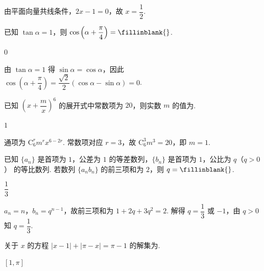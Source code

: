 \begin{solution}
由平面向量共线条件，\(2x-1=0\)，故 \(x=\dfrac12\).
\end{solution}

\begin{problem}
已知 \(\tan\alpha=1\)，则 \(\cos\left(\alpha+\dfrac{\pi}{4}\right)=\fillinblank{}\).
\end{problem}

\begin{answer}
\(0\)
\end{answer}

\begin{solution}
由 \(\tan\alpha=1\) 得 \(\sin\alpha=\cos\alpha\)，因此
\(\cos\left(\alpha+\dfrac{\pi}{4}\right)=\dfrac{\sqrt2}{2}(\cos\alpha-\sin\alpha)=0\).
\end{solution}

\begin{problem}
已知 \(\left(x+\dfrac{m}{x}\right)^6\) 的展开式中常数项为 \(20\)，则实数 \(m\) 的值为\fillinblank{}.
\end{problem}

\begin{answer}
\(1\)
\end{answer}

\begin{solution}
通项为 \(\mathrm C_6^r m^r x^{6-2r}\). 常数项对应 \(r=3\)，故 \(\mathrm C_6^3m^3=20\)，即 \(m=1\).
\end{solution}

\begin{problem}
已知 \(\{a_n\}\) 是首项为 \(1\)，公差为 \(1\) 的等差数列，\(\{b_n\}\) 是首项为 \(1\)，公比为 \(q\)（\(q>0\)） 的等比数列. 若数列 \(\{a_nb_n\}\) 的前三项和为 \(2\)，则 \(q=\fillinblank{}\).
\end{problem}

\begin{answer}
\(\dfrac13\)
\end{answer}

\begin{solution}
\(a_n=n\)，\(b_n=q^{n-1}\)，故前三项和为 \(1+2q+3q^2=2\). 解得 \(q=\dfrac13\) 或 \(-1\)，由 \(q>0\) 知 \(q=\dfrac13\).
\end{solution}

\begin{problem}
关于 \(x\) 的方程 \(|x-1|+|\pi-x|=\pi-1\) 的解集为\fillinblank{}.
\end{problem}

\begin{answer}
\([1,\pi]\)
\end{answer}

